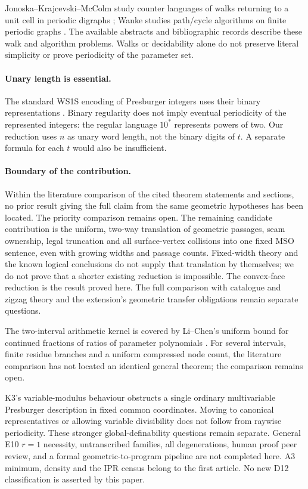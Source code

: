 \documentclass[11pt]{amsart}
\theoremstyle{definition}\newtheorem{definition}{Definition}
\begin{document}
Jonoska--Krajcevski--McColm study counter languages of walks returning
to a unit cell in periodic digraphs \cite{Counter}; Wanke studies
path/cycle algorithms on finite periodic graphs \cite{Wanke}.
The available abstracts and bibliographic records describe these
walk and algorithm problems. Walks or
decidability alone do not preserve literal simplicity or prove
periodicity of the parameter set.

\paragraph{Unary length is essential.}
The standard WS1S encoding of Presburger integers uses their binary
representations \cite[printed pp.~11--12]{Thomas}. Binary regularity
does not imply eventual periodicity of the represented integers:
the regular language $10^*$ represents powers of two. Our reduction
uses $n$ as unary word length, not the binary digits of $t$.
A separate formula for each $t$ would also be insufficient.

\paragraph{Boundary of the contribution.}
Within the literature comparison of the cited theorem statements
and sections, no prior result giving the full claim from the same
geometric hypotheses has been located. The priority comparison remains
open. The
remaining candidate contribution is the uniform, two-way translation
of geometric passages, seam ownership, legal truncation and all
surface-vertex collisions into one fixed MSO sentence, even with
growing widths and passage counts. Fixed-width theory and the known
logical conclusions do not supply that translation by themselves;
we do not prove that a shorter existing reduction is impossible.
The convex-face reduction is the result proved here. The full
comparison with catalogue and zigzag theory and the extension's
geometric transfer obligations remain separate questions.

The two-interval arithmetic kernel is covered by Li--Chen's uniform
bound for continued fractions of ratios of parameter polynomials
\cite[Theorem 27]{LiChen}. For several intervals, finite residue
branches and a uniform compressed node count, the literature comparison has not located an identical general theorem;
the comparison remains open.

K3's variable-modulus behaviour obstructs a single ordinary
multivariable Presburger description in fixed common coordinates.
Moving to canonical representatives or allowing variable divisibility
does not follow from raywise periodicity. These stronger global-definability questions remain separate. General E10 $r=1$ necessity, untranscribed
families, all degenerations, human proof peer review, and a formal
geometric-to-program pipeline are not completed here. A3 minimum,
density and the IPR census belong to the first article. No new D12
classification is asserted by this paper.
\end{document}
